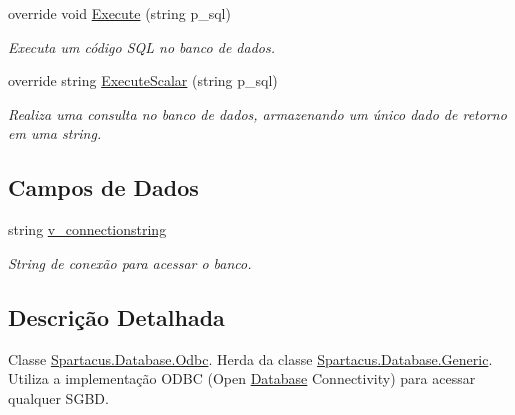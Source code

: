 \begin{DoxyCompactItemize}
override void \hyperlink{classSpartacus_1_1Database_1_1Odbc_a37ff1148e0cb0c03941189bf21d9b8ed}{Execute} (string p\+\_\+sql)
\begin{DoxyCompactList}\small\item\em Executa um código S\+Q\+L no banco de dados. \end{DoxyCompactList}\item 
override string \hyperlink{classSpartacus_1_1Database_1_1Odbc_ab4fcfd110084f00e66aded3478f13aca}{Execute\+Scalar} (string p\+\_\+sql)
\begin{DoxyCompactList}\small\item\em Realiza uma consulta no banco de dados, armazenando um único dado de retorno em uma string. \end{DoxyCompactList}\end{DoxyCompactItemize}
\subsection*{Campos de Dados}
\begin{DoxyCompactItemize}
\item 
string \hyperlink{classSpartacus_1_1Database_1_1Odbc_a4f31d12ddac65ac9ce6ab02eb7fbced8}{v\+\_\+connectionstring}
\begin{DoxyCompactList}\small\item\em String de conexão para acessar o banco. \end{DoxyCompactList}\end{DoxyCompactItemize}


\subsection{Descrição Detalhada}
Classe \hyperlink{classSpartacus_1_1Database_1_1Odbc}{Spartacus.\+Database.\+Odbc}. Herda da classe \hyperlink{classSpartacus_1_1Database_1_1Generic}{Spartacus.\+Database.\+Generic}. Utiliza a implementação O\+D\+B\+C (Open \hyperlink{namespaceSpartacus_1_1Database}{Database} Connectivity) para acessar qualquer S\+G\+B\+D. 




